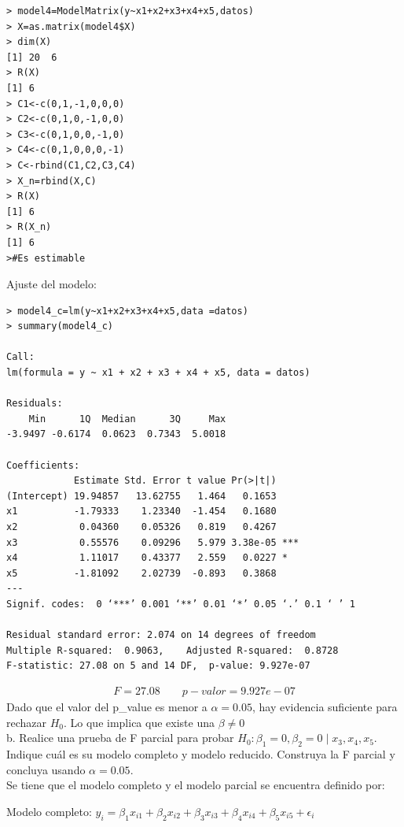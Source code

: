 \documentclass[12pt,a4paper]{report}
\begin{document}
	\begin{verbatim}> model4=ModelMatrix(y~x1+x2+x3+x4+x5,datos)
> X=as.matrix(model4$X)
> dim(X) 
[1] 20  6
> R(X)
[1] 6
> C1<-c(0,1,-1,0,0,0)
> C2<-c(0,1,0,-1,0,0)
> C3<-c(0,1,0,0,-1,0)
> C4<-c(0,1,0,0,0,-1)
> C<-rbind(C1,C2,C3,C4)
> X_n=rbind(X,C)
> R(X)
[1] 6
> R(X_n)
[1] 6
>#Es estimable
\end{verbatim}

	Ajuste del modelo:
	
	\begin{verbatim}
> model4_c=lm(y~x1+x2+x3+x4+x5,data =datos)
> summary(model4_c)

Call:
lm(formula = y ~ x1 + x2 + x3 + x4 + x5, data = datos)

Residuals:
    Min      1Q  Median      3Q     Max 
-3.9497 -0.6174  0.0623  0.7343  5.0018 

Coefficients:
            Estimate Std. Error t value Pr(>|t|)    
(Intercept) 19.94857   13.62755   1.464   0.1653    
x1          -1.79333    1.23340  -1.454   0.1680    
x2           0.04360    0.05326   0.819   0.4267    
x3           0.55576    0.09296   5.979 3.38e-05 ***
x4           1.11017    0.43377   2.559   0.0227 *  
x5          -1.81092    2.02739  -0.893   0.3868    
---
Signif. codes:  0 ‘***’ 0.001 ‘**’ 0.01 ‘*’ 0.05 ‘.’ 0.1 ‘ ’ 1

Residual standard error: 2.074 on 14 degrees of freedom
Multiple R-squared:  0.9063,	Adjusted R-squared:  0.8728 
F-statistic: 27.08 on 5 and 14 DF,  p-value: 9.927e-07
\end{verbatim}
\begin{eqnarray*}
	F=27.08 \qquad p-valor=9.927e-07
\end{eqnarray*}	
Dado que el valor del p\_value es menor a $\alpha =0.05$, 
hay evidencia suficiente para rechazar $H_{0}$. Lo que implica que existe una $\beta\neq 0$\\


b. Realice una prueba de F parcial para probar \(H_0 : \beta_1 = 0, \beta_2 = 0 \mid x_3, x_4, x_5\). Indique cuál es su modelo completo y modelo reducido. Construya la F parcial y concluya usando \(\alpha = 0.05\).\\

Se tiene que el modelo completo y el modelo parcial se encuentra definido por:	
 
 Modelo completo: $y_i =\beta_1 x_{i1} + \beta_2 x_{i2} + \beta_3 x_{i3} + \beta_4 x_{i4} + \beta_5 x_{i5} + \epsilon_i$\\
 
\end{document}
